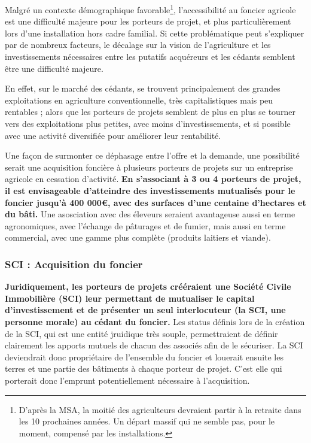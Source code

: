 \documentclass{book}
\begin{document}
Malgré un contexte démographique favorable\footnote{D'après la MSA, la moitié des agriculteurs devraient partir à la retraite dans les 10 prochaines années. Un départ massif qui ne semble pas, pour le moment, compensé par les installations.}, l'accessibilité au foncier agricole est une difficulté majeure pour les porteurs de projet, et plus particulièrement lors d'une installation hors cadre familial. Si cette problématique peut s'expliquer par de nombreux facteurs, le décalage sur la vision de l'agriculture et les investissements nécessaires entre les putatifs acquéreurs et les cédants semblent être une difficulté majeure. 

En effet, sur le marché des cédants, se trouvent principalement des grandes exploitations en agriculture conventionnelle, très capitalistiques mais peu rentables ; alors que les porteurs de projets semblent de plus en plus se tourner vers des exploitations plus petites, avec moins d'investissements, et si possible avec une activité diversifiée pour améliorer leur rentabilité. 

Une façon de surmonter ce déphasage entre l'offre et la demande, une possibilité serait une acquisition foncière à plusieurs porteurs de projets sur un entreprise agricole en cessation d'activité. \textbf{En s'associant à 3 ou 4 porteurs de projet, il est envisageable d'atteindre des investissements mutualisés pour le foncier jusqu'à 400 000\euro{}, avec des surfaces d'une centaine d'hectares et du bâti.} Une asosciation avec des éleveurs seraient avantageuse aussi en terme agronomiques, avec l'échange de pâturages et de fumier, mais aussi en terme commercial, avec une gamme plus complète (produits laitiers et viande).

\subsubsection{SCI : Acquisition du foncier}
\label{part:SCI}

\textbf{Juridiquement, les porteurs de projets crééraient une Société Civile Immobilière (SCI) leur permettant de mutualiser le capital d'investissement et de présenter un seul interlocuteur (la SCI, une personne morale) au cédant du foncier.} Les status définis lors de la création de la SCI, qui est une entité jruidique très souple, permettraient de définir clairement les apports mutuels de chacun des associés afin de le sécuriser. La SCI deviendrait donc propriétaire de l'ensemble du foncier et louerait ensuite les terres et une partie des bâtiments à chaque porteur de projet. C'est elle qui porterait donc l'emprunt potentiellement nécessaire à l'acquisition.
\end{document}
